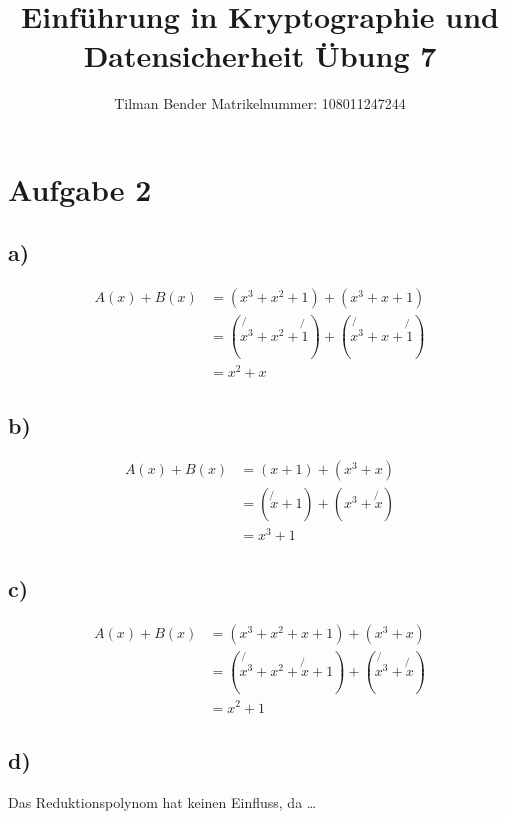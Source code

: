 \documentclass[10pt,a4paper]{article}
\author{Tilman Bender   Matrikelnummer: 108011247244\\}
\title{Einführung in Kryptographie und Datensicherheit Übung 7}
\begin{document}
\maketitle

\section*{Aufgabe 2}
\subsection*{a)}
\begin{align*}
A(x)+B(x) &= (x^{3}+x^{2}+1)+(x^{3}+x+1)\\
		&=(\not{x^{3}}+x^{2}+\not{1})+(\not{x^{3}}+x+\not{1})\\
		&=x^{2}+x
\end{align*}
\subsection*{b)}
\begin{align*}
A(x)+B(x) &= (x+1)+(x^{3}+x)\\
		&= (\not{x}+1)+(x^{3}+\not{x})\\
		&=x^{3}+1
\end{align*}
\subsection*{c)}
\begin{align*}
A(x)+B(x) &=  (x^{3}+x^{2}+x+1)+(x^{3}+x)\\
		&= (\not{x^{3}}+x^{2}+\not{x}+1)+(\not{x^{3}}+\not{x})\\
		&=x^{2}+1
\end{align*}

\subsection*{d)}
Das Reduktionspolynom hat keinen Einfluss, da \dots
\end{document}
